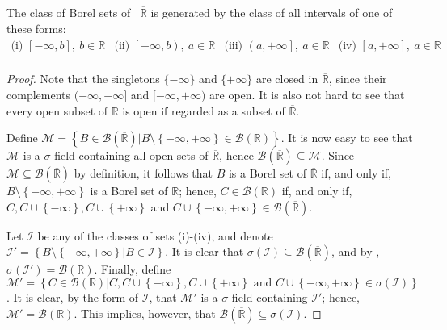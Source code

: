 \begin{prop}\label{proposition:Borel sets on RB}
		The class of Borel sets of ~\(\overline{\mathbb{R}}\) is generated by the class of all intervals of one of these forms:
\[
  \begin{array}{llll}
\text{(i) }\left[-\infty,b\right], ~ b\in\overline{\mathbb{R}}&
\text{(ii) }\left[-\infty,b\right),~ a\in\overline{\mathbb{R}}&
\text{(iii) }\left(a,+\infty\right],~ a\in\overline{\mathbb{R}}&
\text{(iv) }\left[a,+\infty\right],~ a\in\overline{\mathbb{R}}\\
  \end{array}
\]
\end{prop}
\begin{proof}
		Note that the singletons \(\{-\infty\}\) and \(\{+\infty\}\) are closed in \(\overline{\mathbb{R}}\), since their complements \((-\infty,+\infty]\) and \([-\infty,+\infty)\) are open. It is also not hard to see that every open subset of \(\mathbb{R}\) is open if regarded as a subset of \(\overline{\mathbb{R}}\).

		Define \(\mathcal{M}=\left\{B\in\mathscr{B}\left(\overline{\mathbb{R}}\right)\left|B\setminus\left\{-\infty,+\infty\right\}\in\mathscr{B}\left(\mathbb{R}\right)\right.\right\}\). It is now easy to see that \(\mathcal{M}\) is a \(\sigma\)-field containing all open sets of \(\overline{\mathbb{R}}\), hence \(\mathscr{B}\left(\overline{\mathbb{R}}\right)\subseteq\mathcal{M}\). Since \(\mathcal{M}\subseteq\mathscr{B}\left(\overline{\mathbb{R}}\right)\) by definition, it follows that \(B\) is a Borel set of \(\overline{\mathbb{R}}\) if, and only if, \(B\setminus\left\{-\infty,+\infty\right\}\) is a Borel set of \(\mathbb{R}\); hence, \(C\in\mathscr{B}\left(\mathbb{R}\right)\) if, and only if, \(C, C\cup\left\{-\infty\right\}, C\cup\left\{+\infty\right\}\) and \(C\cup\left\{-\infty,+\infty\right\}\in\mathscr{B}\left(\overline{\mathbb{R}}\right)\).

Let \(\mathcal{I}\) be any of the classes of sets (i)-(iv), and denote \(\mathcal{I}'=\left\{B\setminus\left\{-\infty,+\infty\right\}\left|B\in\mathcal{I}\right.\right\}\). It is clear that \(\sigma(\mathcal{I})\subseteq\mathscr{B}\left(\overline{\mathbb{R}}\right)\), and by , \(\sigma(\mathcal{I}')=\mathscr{B}\left(\mathbb{R}\right)\). Finally, define \(\mathcal{M}'=\left\{C\in\mathscr{B}\left(\mathbb{R}\right)\left|C, C\cup\left\{-\infty\right\}, C\cup\left\{+\infty\right\} \text{ and } C\cup\left\{-\infty,+\infty\right\}\in\sigma\left(\mathcal{I}\right)\right.\right\}\). It is clear, by the form of \(\mathcal{I}\), that \(\mathcal{M}'\) is a \(\sigma\)-field containing \(\mathcal{I}'\); hence, \(\mathcal{M}'=\mathscr{B}\left(\mathbb{R}\right)\). This implies, however, that \(\mathscr{B}\left(\overline{\mathbb{R}}\right)\subseteq\sigma(\mathcal{I})\).
\end{proof}


